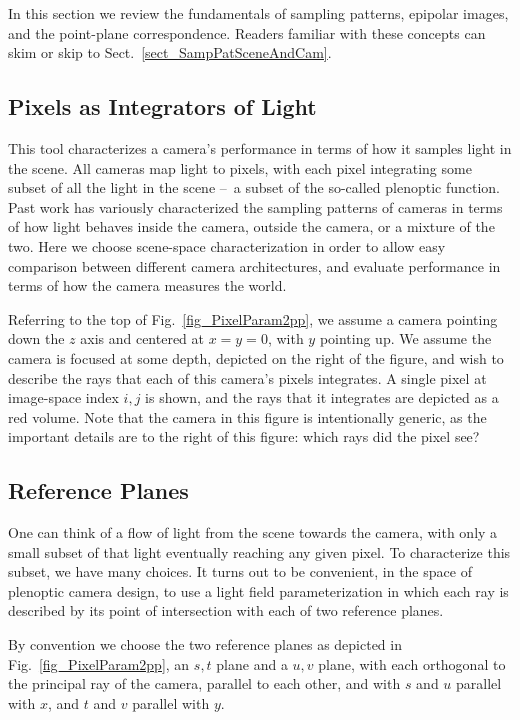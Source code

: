 \documentclass[onecolumn]{article}
\begin{document}
In this section we review the fundamentals of sampling patterns, epipolar images, and the point-plane correspondence.  Readers familiar with these concepts can skim or skip to Sect.~\ref{sect_SampPatSceneAndCam}.

\subsection{Pixels as Integrators of Light}

This tool characterizes a camera's performance in terms of how it samples light in the scene.  All cameras map light to pixels, with each pixel integrating some subset of all the light in the scene --~a subset of the so-called plenoptic function.  Past work has variously characterized the sampling patterns of cameras in terms of how light behaves inside the camera, outside the camera, or a mixture of the two.  Here we choose scene-space characterization in order to allow easy comparison between different camera architectures, and evaluate performance in terms of how the camera measures the world.

Referring to the top of Fig.~\ref{fig_PixelParam2pp}, we assume a camera pointing down the $z$ axis and centered at $x=y=0$, with $y$ pointing up.  We assume the camera is focused at some depth, depicted on the right of the figure, and wish to describe the rays that each of this camera's pixels integrates.  A single pixel at image-space index $i,j$ is shown, and the rays that it integrates are depicted as a red volume.  Note that the camera in this figure is intentionally generic, as the important details are to the right of this figure: which rays did the pixel see?

\subsection{Reference Planes}

One can think of a flow of light from the scene towards the camera, with only a small subset of that light eventually reaching any given pixel.  To characterize this subset, we have many choices.  It turns out to be convenient, in the space of plenoptic camera design, to use a light field parameterization in which each ray is described by its point of intersection with each of two reference planes.

By convention we choose the two reference planes as depicted in Fig.~\ref{fig_PixelParam2pp}, an $s,t$ plane and a $u,v$ plane, with each orthogonal to the principal ray of the camera, parallel to each other, and with $s$ and $u$ parallel with $x$, and $t$ and $v$ parallel with $y$.
\end{document}
